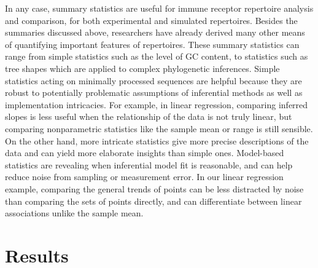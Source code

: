 \documentclass{article}
\begin{document}
In any case, summary statistics are useful for immune receptor repertoire analysis and comparison, for both experimental and simulated repertoires.
Besides the summaries discussed above, researchers have already derived many other means of quantifying important features of repertoires.
These summary statistics can range from simple statistics such as the level of GC content, to statistics such as tree shapes which are applied to complex phylogenetic inferences.
Simple statistics acting on minimally processed sequences are helpful because they are robust to potentially problematic assumptions of inferential methods as well as implementation intricacies.
For example, in linear regression, comparing inferred slopes is less useful when the relationship of the data is not truly linear, but comparing nonparametric statistics like the sample mean or range is still sensible.
On the other hand, more intricate statistics give more precise descriptions of the data and can yield more elaborate insights than simple ones.
Model-based statistics are revealing when inferential model fit is reasonable, and can help reduce noise from sampling or measurement error.
In our linear regression example, comparing the general trends of points can be less distracted by noise than comparing the sets of points directly, and can differentiate between linear associations unlike the sample mean.



\section*{Results}

\end{document}
